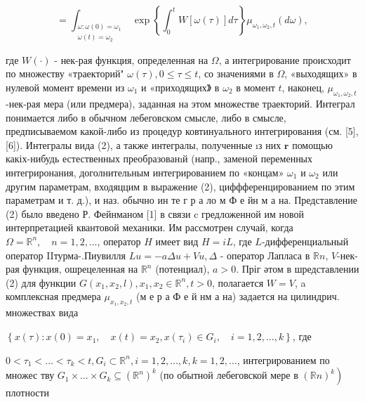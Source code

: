 \documentclass[10pt]{article}
\begin{document}
\[

=\int_{\substack{\omega: \omega(0)=\omega_{1} \\ \omega(t)=\omega_{2}}} \exp \left\{\int_{0}^{t} W[\omega(\tau)] d \tau\right\} \mu_{\omega_{1}, \omega_{2}, t}(d \omega),

\]



где $W(\cdot)$ - нек-рая функция, определенная на $\Omega$, а интегрирование происходит по множеству «траекторий" $\omega(\tau), 0 \leqslant \tau \leqslant t$, со значениями в $\Omega$, «выходящих» в нулевой момент времени из $\omega_{1}$ и «приходящих》 в $\omega_{2}$ в момент $t$, наконец, $\mu_{\omega_{1}, \omega_{2}, t}$-нек-рая мера (или предмера), заданная на этом множестве траекторий. Интеграл понимается либо в обычном лебеговском смысле, либо в смысле, предписываемом какой-либо из процедур ковтинуального интегрирования (см. [5], [6]). Интегралы вида (2), а также интегралы, полученные ıз них $\boldsymbol{r}$ помощью какіх-нибудь естественных преобразованıй (напр., заменой переменных интегриронания, доголнительным интегрированием по «концам» $\omega_{1}$ и $\omega_{2}$ или другим параметрам, входяццим в выражение (2), циффференцированием по этим параметрам и т. д.), и наз. обычно ин те г р а ло м Ф е йн м а на. Представление (2) было введено Р. Фейнманом [1] в связи c гредложенной им новой интерпретацией квантовой механики. Им рассмотрен случай, когда $\Omega=\mathbb{R}^{n}, \quad n=1,2, \ldots$, оператор $H$ имеет вид $H=i L$, где $L$-дифференциальный оператор IIтурма-.Пиувилля $L u=-a \Delta u+V u, \Delta$ - оператор Лапласа в $\mathbb{R} n$, $V$-нек-рая функция, ошрецеленная на $\mathbb{R}^{n}$ (потенциал), $a>0$. Пріг әтом в шредставлении (2) для функции $G\left(x_{1}, x_{2}, l\right), x_{1}, x_{2} \in \mathbb{R}^{n}, t>0$, полагается $W=V$, a комплексная предмера $\mu_{x_{1}, x_{2}, t}$ (м е р а Ф е й нм а на) задается на цилиндрич. множествах вида



$\left\{x(\tau): x(0)=x_{1}, \quad x(t)=x_{2}, x\left(\tau_{i}\right) \in G_{i}, \quad i=1,2, \ldots, k\right\}$, где



$0<\tau_{1}<\ldots<\tau_{k}<t, G_{i} \subset \mathbb{R}^{n}, i=1,2, \ldots, k, k=1,2, \ldots$, интегрированием по множес тву $G_{1} \times \ldots \times G_{k} \subseteq\left(\mathbb{R}^{n}\right)^{k}$ (по обытной лебеговской мере в $\left.(\mathbb{R} n)^{k}\right)$ плотности
\end{document}
